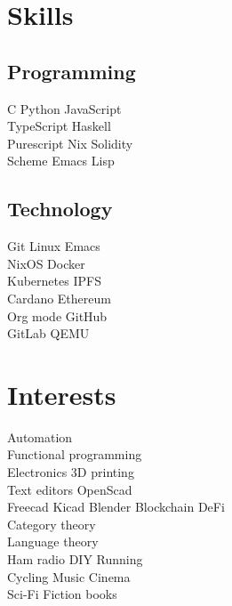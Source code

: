 \documentclass[]{cv}
\begin{document}
\begin{minipage}[t]{0.24\textwidth}



\section{Skills}
\subsection{Programming}
\textbullet{} C
\textbullet{} Python
\textbullet{} JavaScript \\
\textbullet{} TypeScript
\textbullet{} Haskell \\
\textbullet{} Purescript
\textbullet{} Nix
\textbullet{} Solidity \\
\textbullet{} Scheme
\textbullet{} Emacs Lisp

\sectionsep

\subsection{Technology}
\textbullet{} Git
\textbullet{} Linux
\textbullet{} Emacs \\
\textbullet{} NixOS
\textbullet{} Docker \\
\textbullet{} Kubernetes
\textbullet{} IPFS \\
\textbullet{} Cardano
\textbullet{} Ethereum \\
\textbullet{} Org mode
\textbullet{} GitHub \\
\textbullet{} GitLab
\textbullet{} QEMU
\sectionsep

\section{Interests}
\textbullet{} Automation  \\
\textbullet{} Functional programming \\ 
\textbullet{} Electronics  
\textbullet{} 3D printing \\  
\textbullet{} Text editors  
\textbullet{} OpenScad \\
\textbullet{} Freecad  
\textbullet{} Kicad  
\textbullet{} Blender  
\textbullet{} Blockchain  
\textbullet{} DeFi  \\
\textbullet{} Category theory  \\
\textbullet{} Language theory   \\
\textbullet{} Ham radio  
\textbullet{} DIY  
\textbullet{} Running  \\
\textbullet{} Cycling  
\textbullet{} Music  
\textbullet{} Cinema  \\
\textbullet{} Sci-Fi  
\textbullet{} Fiction books  



\end{minipage}
\end{document}
